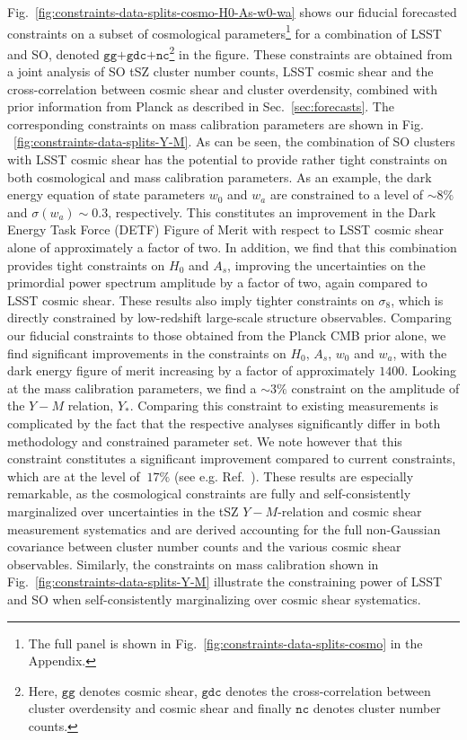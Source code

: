 \documentclass[%
 reprint,
nofootinbib,
 amsmath,amssymb,
 aps,
]{revtex4-1}
\begin{document}
Fig.~\ref{fig:constraints-data-splits-cosmo-H0-As-w0-wa} shows our fiducial forecasted constraints on a subset of cosmological parameters\footnote{The full panel is shown in Fig.~\ref{fig:constraints-data-splits-cosmo} in the Appendix.} for a combination of LSST and SO, denoted $\texttt{gg+gdc+nc}$\footnote{Here, $\texttt{gg}$ denotes cosmic shear, $\texttt{gdc}$ denotes the cross-correlation between cluster overdensity and cosmic shear and finally $\texttt{nc}$ denotes cluster number counts.} in the figure. These constraints are obtained from a joint analysis of SO tSZ cluster number counts, LSST cosmic shear and the cross-correlation between cosmic shear and cluster overdensity, combined with prior information from Planck as described in Sec.~\ref{sec:forecasts}. The corresponding constraints on mass calibration parameters are shown in Fig. ~\ref{fig:constraints-data-splits-Y-M}. As can be seen, the combination of SO clusters with LSST cosmic shear has the potential to provide rather tight constraints on both cosmological and mass calibration parameters. As an example, the dark energy equation of state parameters $w_{0}$ and $w_{a}$ are constrained to a level of $\sim 8 \%$ and $\sigma(w_{a})\sim 0.3$, respectively. This constitutes an improvement in the Dark Energy Task Force (DETF) Figure of Merit \cite{Albrecht:2006} with respect to LSST cosmic shear alone of approximately a factor of two. In addition, we find that this combination provides tight constraints on $H_{0}$ and $A_{s}$, improving the uncertainties on the primordial power spectrum amplitude by a factor of two, again compared to LSST cosmic shear. These results also imply tighter constraints on $\sigma_{8}$, which is directly constrained by low-redshift large-scale structure observables. Comparing our fiducial constraints to those obtained from the Planck CMB prior alone, we find significant improvements in the constraints on $H_{0}$, $A_{s}$, $w_{0}$ and $w_{a}$, with the dark energy figure of merit increasing by a factor of approximately $1400$. Looking at the mass calibration parameters, we find a $\sim 3 \%$ constraint on the amplitude of the $Y-M$ relation, $Y_{*}$. Comparing this constraint to existing measurements is complicated by the fact that the respective analyses significantly differ in both methodology and constrained parameter set. We note however that this constraint constitutes a significant improvement compared to current constraints, which are at the level of $~ 17 \%$ (see e.g. Ref.~\cite{Bocquet:2019}). These results are especially remarkable, as the cosmological constraints are fully and self-consistently marginalized over uncertainties in the tSZ $Y-M$-relation and  cosmic shear measurement systematics and are derived accounting for the full non-Gaussian covariance between cluster number counts and the various cosmic shear observables. Similarly, the constraints on mass calibration shown in Fig.~\ref{fig:constraints-data-splits-Y-M} illustrate the constraining power of LSST and SO when self-consistently marginalizing over cosmic shear systematics.
\end{document}

